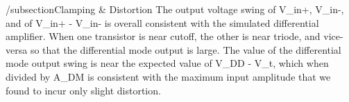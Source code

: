 /subsection{Clamping & Distortion}
The output voltage swing of V_{in+}, V_{in-}, and of V_{in+} - V_{in-} is overall consistent with the simulated differential amplifier.
When one transistor is near cutoff, the other is near triode, and vice-versa so that the differential mode output is large.
The value of the differential mode output swing is near the expected value of V_{DD} - V_{t}, which when divided by A_{DM} is consistent with the maximum input amplitude that we found to incur only slight distortion.